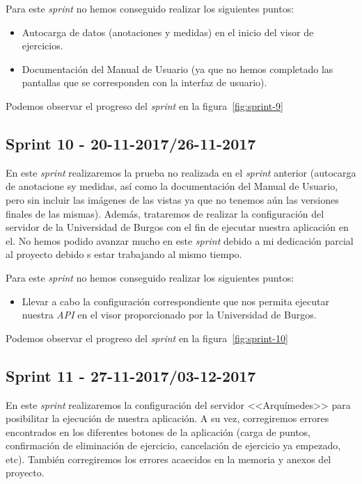 Para este \textit{sprint} no hemos conseguido realizar  los siguientes puntos:
\begin{itemize}
	\item Autocarga de datos (anotaciones y medidas) en el inicio del visor de ejercicios.
	\item Documentación del Manual de Usuario (ya que no hemos completado las pantallas que se corresponden con la interfaz de usuario).
\end{itemize}

Podemos observar el progreso del \textit{sprint} en la figura~\ref{fig:sprint-9}

\subsection{Sprint 10 - 20-11-2017/26-11-2017}
En este \textit{sprint} realizaremos la prueba no realizada en el \textit{sprint} anterior (autocarga de anotacione sy medidas, así como la documentación del Manual de Usuario, pero sin incluir las imágenes de las vistas ya que no tenemos aún las versiones finales de las mismas). Además, trataremos de realizar la configuración del servidor de la Universidad de Burgos con el fin de ejecutar nuestra aplicación en el. No hemos podido avanzar mucho en este \textit{sprint} debido a mi dedicación parcial al proyecto debido s estar trabajando al mismo tiempo.

Para este \textit{sprint} no hemos conseguido realizar  los siguientes puntos:
\begin{itemize}
	\item Llevar a cabo la configuración correspondiente que nos permita ejecutar nuestra \textit{API} en el visor proporcionado por la Universidad de Burgos.
\end{itemize}

Podemos observar el progreso del \textit{sprint} en la figura~\ref{fig:sprint-10}

\subsection{Sprint 11 - 27-11-2017/03-12-2017}
En este \textit{sprint} realizaremos la configuración del servidor <<Arquímedes>> para posibilitar la ejecución de nuestra aplicación. A su vez, corregiremos errores encontrados en los diferentes botones de la aplicación (carga de puntos, confirmación de eliminación de ejercicio, cancelación de ejercicio ya empezado, etc). También corregiremos los errores acaecidos en la memoria y anexos del proyecto.

